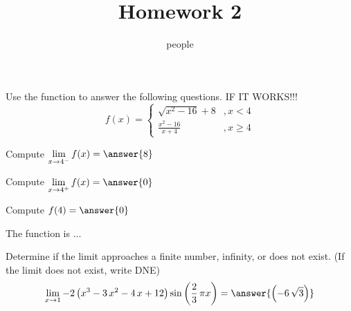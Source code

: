 \documentclass[•]{ximera}
\title{Homework 2}
\author{people}
\begin{document}
\maketitle

\begin{shuffle}%
\begin{exercise}

Use the function to answer the following questions.  IF IT WORKS!!!
\[f(x)=\left\{\begin{array}{ll}{{\sqrt{x^{2} - 16} + 8}}&,x<{{4}}\\[5pt]
{{\frac{x^{2} - 16}{x + 4}}}&,x\geq{{4}}
\end{array}\right.\]
\begin{shuffle}%
\begin{problem}
Compute $\lim\limits_{x\to{{4}}^-}f(x)=\answer{{{8}}}$\\[1in]
\end{problem}
\begin{problem}
Compute $\lim\limits_{x\to{{4}}^+}f(x)=\answer{{{0}}}$\\[1in]
\end{problem}
\begin{problem}
Compute $f({{4}})=\answer{{{0}}}$\\[1in]
\end{problem}
\begin{problem}
The function is ...
\begin{multipleChoice}
\end{multipleChoice}
\end{problem}
\end{shuffle}
\end{exercise}%





\begin{exercise}
Determine if the limit approaches a finite number, infinity, or does not exist. (If the limit does not exist, write DNE)
\[\lim_{x\to{{1}}}{{-2 \, {\left(x^{3} - 3 \, x^{2} - 4 \, x + 12\right)} \sin\left(\frac{2}{3} \, \pi x\right)}}=\answer{{{\left(-6 \, \sqrt{3}\right)}}}\]

\end{exercise}%
\end{shuffle}
\end{document}

